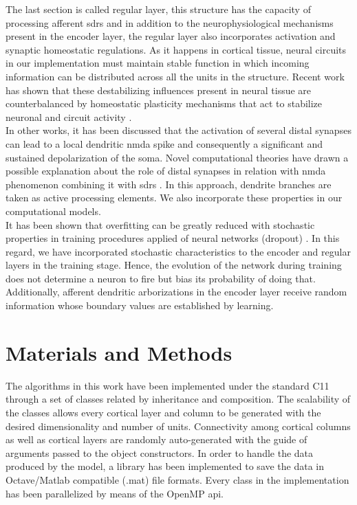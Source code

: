 \documentclass[11pt,a4paper]{article}
\newcommand{\CC}{C\nolinebreak\hspace{-.05em}\raisebox{.4ex}{\tiny\bf +}\nolinebreak\hspace{-.10em}\raisebox{.4ex}{\tiny\bf +}}
\begin{document}
The last section is called regular layer, this structure has the capacity of
processing afferent \glspl{sdr} and in addition to the neurophysiological
mechanisms present in the encoder layer, the regular layer also incorporates
activation and synaptic homeostatic regulations.
As it happens in cortical tissue, neural circuits in our implementation
must maintain stable function in which incoming information can be distributed
across all the units in the structure.
Recent work has shown that these destabilizing influences present in neural tissue
are counterbalanced
by homeostatic plasticity mechanisms that act to stabilize neuronal
and circuit activity \cite{turrigiano_2012}. \\

In other works, it has been discussed 
that the activation of several distal
synapses can lead to a local dendritic \gls{nmda}
spike and consequently a significant
and sustained depolarization of the soma.
Novel computational theories have drawn a possible explanation
about the role of distal synapses in relation with \gls{nmda}
phenomenon \cite{hawkins_2016}
combining it with \glspl{sdr} \cite{ahmad_2016}.
In this approach, dendrite branches are taken as active processing elements.
We also incorporate these properties in our computational models. \\

It has been shown that overfitting can be greatly reduced with
stochastic properties in training procedures
applied of neural networks (dropout) \cite{JMLR:v15:srivastava14a}.
In this regard, we have incorporated stochastic characteristics to
the encoder and regular layers in the training stage.
Hence, the evolution of the network during training does not
determine a neuron to fire but bias its probability
of doing that. Additionally, afferent dendritic arborizations
in the encoder layer receive random information whose
boundary values are established by learning. \\












\section{Materials and Methods}

The algorithms in this work have been implemented under the standard \CC11 through a set of
classes related by inheritance and composition.
The scalability of the classes allows every cortical layer and column to be generated
with the desired dimensionality and number of units. Connectivity among cortical columns as well as
cortical layers are randomly auto-generated with the guide of arguments passed to the
object constructors. In order to handle the data produced by the model,
a library has been implemented to save the data in Octave/Matlab compatible (.mat) file formats.
Every class in the implementation has been parallelized by means of the OpenMP \gls{api}. \\
\end{document}
